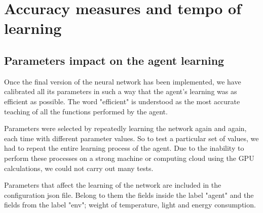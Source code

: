 \documentclass{article}
\begin{document}
\section{Accuracy measures and tempo of learning}

\subsection{Parameters impact on the agent learning}
Once the final version of the neural network has been implemented,
we have calibrated all its parameters in such a way that the agent's learning was as efficient as possible.
The word "efficient" is understood as the most accurate teaching of all the functions performed by the agent.

Parameters were selected by repeatedly learning the network again and again, each time with different parameter values.
So to test a particular set of values, we had to repeat the entire learning process of the agent.
Due to the inability to perform these processes on a strong machine or computing cloud using the GPU calculations,
we could not carry out many tests.

Parameters that affect the learning of the network are included in the configuration json file.
Belong to them the fields inside the label "agent" and the fields from the label "env"; weight of temperature, light and energy consumption.\\
\end{document}

